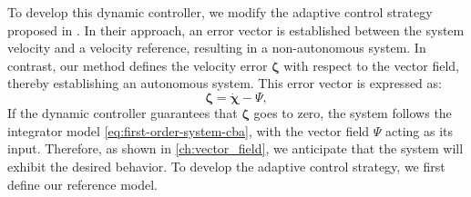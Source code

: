 To develop this dynamic controller,  we modify the adaptive control strategy proposed in \cite{Culbertson2021}. In their approach, an error vector is established between the system velocity and a velocity reference, resulting in a non-autonomous system. In contrast, our method defines the velocity error $\boldsymbol{\zeta}$ with respect to the vector field, thereby establishing an autonomous system. This error vector is expressed as:
\begin{equation}
    \boldsymbol{\zeta} = \dot{\boldsymbol{\chi}} - \Psi,\label{eq:errorvector-s}
\end{equation}
If the dynamic controller guarantees that $\boldsymbol{\zeta}$ goes to zero, the system follows the integrator model \eqref{eq:first-order-system-cba}, with the vector field $\Psi$ acting as its input. Therefore, as shown in \cref{ch:vector_field}, we anticipate that the system will exhibit the desired behavior. To develop the adaptive control strategy, we first define our reference model.

